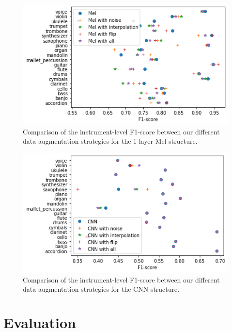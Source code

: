 \documentclass[final]{cvpr}
\begin{document}
\begin{figure}
	\centering
	\includegraphics[scale = 0.5]{mel_data.png}
	\caption{Comparison of the instrument-level F1-score between our different data augmentation strategies for the 1-layer Mel structure.}
	\label{mel_data}
\end{figure}
\begin{figure}
	\centering
	\includegraphics[scale = 0.5]{cnn_data.png}
	\caption{Comparison of the instrument-level F1-score between our different data augmentation strategies for the CNN structure.}
	\label{cnn_data}
\end{figure}
\section{Evaluation}

{\small
	
	
}
\end{document}
